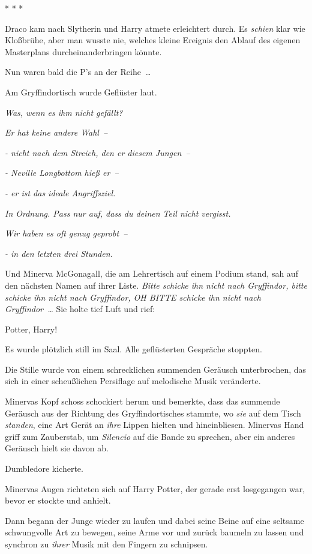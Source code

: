 * * *

Draco kam nach Slytherin und Harry atmete erleichtert durch. Es \emph{schien}
klar wie Kloßbrühe, aber man wusste nie, welches kleine Ereignis den Ablauf des
eigenen Masterplans durcheinanderbringen könnte.

Nun waren bald die P’s an der Reihe …

Am Gryffindortisch wurde Geflüster laut.

\emph{\glqq Was, wenn es ihm nicht gefällt?\grqq{}}

\emph{\grqq{} Er hat keine andere Wahl –\grqq{}}

\emph{\grqq{} - nicht nach dem Streich, den er diesem Jungen –\grqq{}}

\emph{\grqq{} - Neville Longbottom hieß er –\grqq{}}

\emph{\grqq{} - er ist das ideale Angriffsziel.\grqq{}}

\emph{\grqq{} In Ordnung. Pass nur auf, dass du deinen Teil nicht
vergisst.\grqq{}}

\emph{\grqq{} Wir haben es oft genug geprobt –\grqq{}}

\emph{\grqq{} - in den letzten drei Stunden.\grqq{}}

Und Minerva McGonagall, die am Lehrertisch auf einem Podium stand, sah auf den
nächsten Namen auf ihrer Liste. \emph{Bitte schicke ihn nicht nach Gryffindor,
bitte schicke ihn nicht nach Gryffindor, OH BITTE schicke ihn nicht nach
Gryffindor …} Sie holte tief Luft und rief:

\grqq{} Potter, Harry!\grqq{}

Es wurde plötzlich still im Saal. Alle geflüsterten Gespräche stoppten.

Die Stille wurde von einem schrecklichen summenden Geräusch unterbrochen, das
sich in einer scheußlichen Persiflage auf melodische Musik veränderte.

Minervas Kopf schoss schockiert herum und bemerkte, dass das summende Geräusch
aus der Richtung des Gryffindortisches stammte, wo \emph{sie} auf dem Tisch
\emph{standen}, eine Art Gerät an \emph{ihre} Lippen hielten und hineinbliesen.
Minervas Hand griff zum Zauberstab, um \emph{Silencio} auf die Bande zu
sprechen, aber ein anderes Geräusch hielt sie davon ab.

Dumbledore kicherte.

Minervas Augen richteten sich auf Harry Potter, der gerade erst losgegangen war,
bevor er stockte und anhielt.

Dann begann der Junge wieder zu laufen und dabei seine Beine auf eine seltsame
schwungvolle Art zu bewegen, seine Arme vor und zurück baumeln zu lassen und
synchron zu \emph{ihrer} Musik mit den Fingern zu schnipsen.

